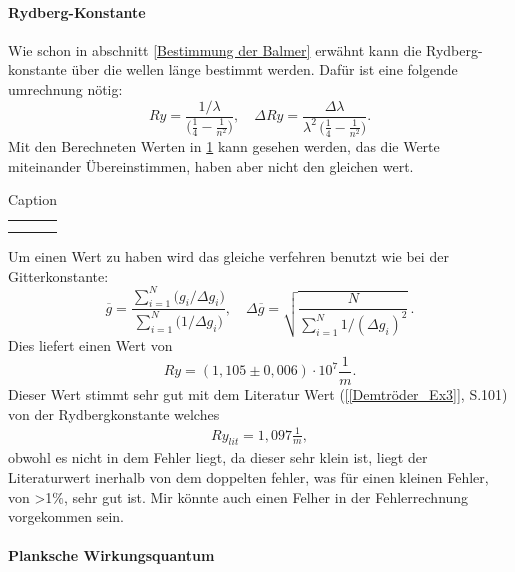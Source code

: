 \paragraph{Rydberg-Konstante} \label{Rydberg-konst}
Wie schon in abschnitt \ref{Bestimmung der Balmer} erwähnt kann die Rydberg-konstante über die wellen länge bestimmt werden.
Dafür ist eine folgende umrechnung nötig:
\begin{equation}
  Ry
  = \frac{1/\lambda}{\bigl(\tfrac{1}{4} - \tfrac{1}{n^{2}}\bigr)},
  \quad
  \Delta Ry
  = \frac{\Delta\lambda}{\lambda^{2}\,\bigl(\tfrac{1}{4} - \tfrac{1}{n^{2}}\bigr)}.
\end{equation}
Mit den Berechneten Werten in \cref{tab:Rydberg} kann gesehen werden, das die Werte miteinander Übereinstimmen, haben aber nicht den gleichen wert. 

\begin{table}[htbp]
    \centering
    \begin{tabular}{c|c}
         &  \\
         & 
    \end{tabular}
    \caption{Caption}
    \label{tab:Rydberg}
\end{table}

Um einen Wert zu haben wird das gleiche verfehren benutzt wie bei der Gitterkonstante:
\begin{equation}
  \overline{g}
  = \frac{\sum_{i=1}^{N} \bigl(g_i/\Delta g_i\bigr)}
         {\sum_{i=1}^{N} \bigl(1/\Delta g_i\bigr)},
  \quad
  \Delta\overline{g}
  = \sqrt{\frac{N}{\sum_{i=1}^{N} 1/(\Delta g_i)^{2}}}\,.
\end{equation}
Dies liefert einen Wert von 
\begin{equation}
    Ry = (1,105 \pm 0,006)\cdot 10^7 \frac{1}{m}.
\end{equation}
Dieser Wert stimmt sehr gut mit dem Literatur Wert (\cref{[Demtröder_Ex3]}, S.101) von der Rydbergkonstante welches 
\begin{align}
    Ry_{lit} = 1,097 \frac{1}{m},
\end{align}
obwohl es nicht in dem Fehler liegt, da dieser sehr klein ist, liegt der Literaturwert inerhalb von dem doppelten fehler, was für einen kleinen Fehler, von >1$\%$, sehr gut ist.
Mir könnte auch einen Felher in der Fehlerrechnung vorgekommen sein.

\paragraph{Planksche Wirkungsquantum}

